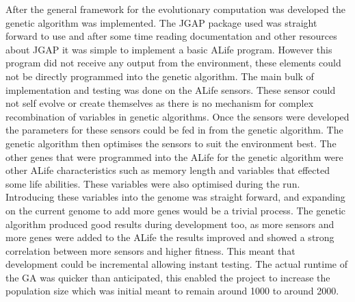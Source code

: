 \documentclass[12pt]{article}
\begin{document}
After the general framework for the evolutionary computation was developed the genetic algorithm was implemented. The JGAP package used
was straight forward to use and after some time reading documentation and other resources about JGAP it was simple to implement a basic
ALife program. However this program did not receive any output from the environment, these elements could not be directly programmed into
the genetic algorithm. The main bulk of implementation and testing was done on the ALife sensors. These sensor could not self evolve or 
create themselves as there is no mechanism for complex recombination of variables in genetic algorithms. Once the sensors were developed
the parameters for these sensors could be fed in from the genetic algorithm. The genetic algorithm then optimises the sensors to suit
the environment best. The other genes that were programmed into the ALife for the genetic algorithm were other ALife characteristics
such as memory length and variables that effected some life abilities. These variables were also optimised during the run. Introducing
these variables into the genome was straight forward, and expanding on the current genome to add more genes would be a trivial process.
The genetic algorithm produced good results during development too, as more sensors and more genes were added to the ALife the results
improved and showed a strong correlation between more sensors and higher fitness. This meant that development could be incremental allowing
instant testing. The actual runtime of the GA was quicker than anticipated, this enabled the project to increase the population size which
was initial meant to remain around 1000 to around 2000.
\end{document}
